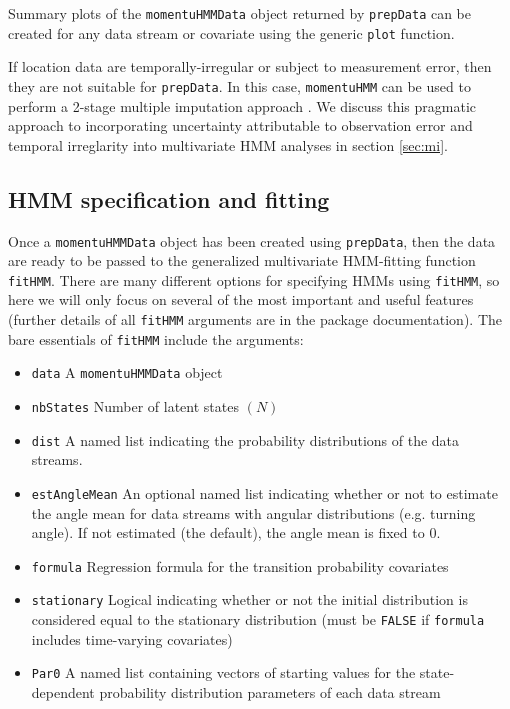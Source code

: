 \documentclass[12pt]{article}\usepackage[]{graphicx}\usepackage[]{xcolor}
\begin{document}
Summary plots of the \verb|momentuHMMData| object returned by \verb|prepData| can be created for any data stream or covariate using the generic \verb|plot| function.

If location data are temporally-irregular or subject to measurement error, then they are not suitable for \verb|prepData|. In this case, \verb|momentuHMM| can be used to perform a 2-stage multiple imputation approach \citep{McClintock2017}. We discuss this pragmatic approach to incorporating uncertainty attributable to observation error and temporal irreglarity into multivariate HMM analyses in section \ref{sec:mi}.

\subsection{HMM specification and fitting}
Once a \verb|momentuHMMData| object has been created using \verb|prepData|, then the data are ready to be passed to the generalized multivariate HMM-fitting function \verb|fitHMM|. There are many different options for specifying HMMs using \verb|fitHMM|, so here we will only focus on several of the most important and useful features (further details of all \verb|fitHMM| arguments are in the package documentation). The bare essentials of \verb|fitHMM| include the arguments:
\begin{itemize}
  \item{\verb|data|} A \verb|momentuHMMData| object
  \item{\verb|nbStates|} Number of latent states $(N)$
  \item{\verb|dist|} A named list indicating the probability distributions of the data streams.
  \item{\verb|estAngleMean|} An optional named list indicating whether or not to estimate the angle mean for data streams with angular distributions (e.g. turning angle). If not estimated (the default), the angle mean is fixed to 0.
  \item{\verb|formula|} Regression formula for the transition probability covariates
  \item{\verb|stationary|} Logical indicating whether or not the initial distribution is considered equal to the stationary distribution (must be \verb|FALSE| if \verb|formula| includes time-varying covariates) 
  \item{\verb|Par0|} A named list containing vectors of starting values for the state-dependent probability distribution parameters of each data stream
\end{itemize}
\end{document}

